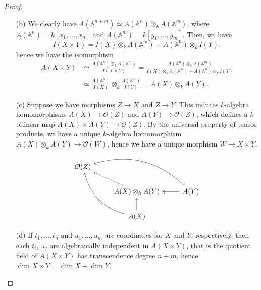 \documentclass[12pt]{article}
\newcommand{\A}{\mathbb{A}}
\newcommand{\OO}{\mathcal{O}}
\theoremstyle{definition}
\begin{document}
\begin{enumerate} [label=\textbf{\arabic*.}, leftmargin=-0.05em]
\begin{proof}
\begin{itemize}
        \item[(b)] We clearly have $A(\A^{n + m}) \simeq A(\A^n) \otimes_k A(\A^m)$, where $A(\A^n) = k[x_1, \dots, x_n]$ and $A(\A^m) = k[y_1, \dots, y_m]$. Then, we have
        \begin{equation*}
            I(X \times Y) = I(X) \otimes_k A(\A^m) + A(\A^n) \otimes_k I(Y),
        \end{equation*}
        hence we have the isomorphism
        \begin{align*}
           A(X \times Y) & \simeq \frac{A(\A^n) \otimes_k A(\A^m)}{I(X \times Y)} = \frac{A(\A^n) \otimes_k A(\A^m)}{ I(X) \otimes_k A(\A^m) + A(\A^n) \otimes_k I(Y)} \\
           & \simeq \frac{A(\A^n)}{I(X)} \otimes_k \frac{A(\A^m)}{I(Y)} = A(X) \otimes_k A(Y).
        \end{align*}

        \item[(c)] Suppose we have morphisms $Z \to X$ and $Z \to Y$. This induces $k$-algebra homomorphisms $A(X) \to \OO(Z)$ and $A(Y) \to \OO(Z)$, which defines a $k$-bilinear map $A(X) \times A(Y) \to \OO(Z)$. By the universal property of tensor products, we have a unique $k$-algebra homomorphism $A(X) \otimes_k A(Y) \to \OO(W)$, hence we have a unique morphism $W \to X \times Y$.
        \[ \begin{tikzcd}
            \OO(Z) &                                        &                                        \\
                   & A(X) \otimes_k A(Y) \arrow[lu, dashed] & A(Y) \arrow[llu, bend right] \arrow[l] \\
                   & A(X) \arrow[luu, bend left] \arrow[u]  &                                       
            \end{tikzcd} \]
        
        \item[(d)] If $t_1, \dots, t_n$ and $u_1, \dots, u_m$ are coordinates for $X$ and $Y$, respectively, then each $t_i$, $u_j$ are algebraically independent in $A(X \times Y)$, that is the quotient field of $A(X \times Y)$ has transcendence degree $n + m$, hence $\dim{X \times Y} = \dim{X} + \dim{Y}$.
    \end{itemize}
\end{proof}


\end{enumerate}
\end{document}
